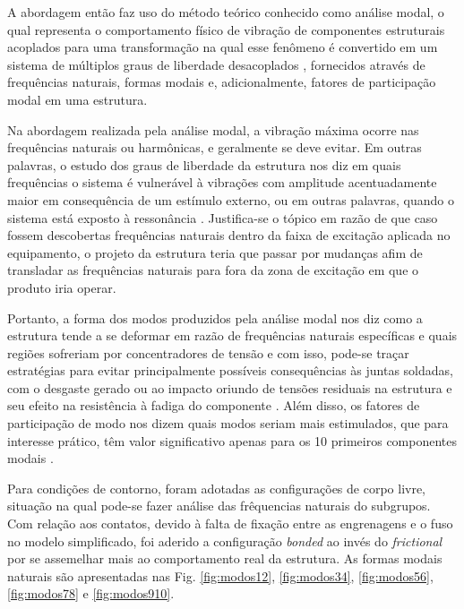 A abordagem então faz uso do método teórico conhecido como análise modal, o qual representa o comportamento físico de vibração de componentes estruturais acoplados para uma transformação na qual esse fenômeno é convertido em um sistema de múltiplos graus de liberdade desacoplados \cite{inmanbook}, fornecidos através de frequências naturais, formas modais e, adicionalmente, fatores de participação modal em uma estrutura.

Na abordagem realizada pela análise modal, a vibração máxima ocorre nas frequências naturais ou harmônicas, e geralmente se deve evitar. Em outras palavras, o estudo dos graus de liberdade da estrutura nos diz em quais frequências o sistema é vulnerável à vibrações com amplitude acentuadamente maior em consequência de um estímulo externo, ou em outras palavras, quando o sistema está exposto à ressonância \cite{inmanbook}. Justifica-se o tópico em razão de que caso fossem descobertas frequências naturais dentro da faixa de excitação aplicada no equipamento, o projeto da estrutura teria que passar por mudanças afim de transladar as frequências naturais para fora da zona de excitação em que o produto iria operar.

Portanto, a forma dos modos produzidos pela análise modal nos diz como a estrutura tende a se deformar em razão de frequências naturais específicas e quais regiões sofreriam por concentradores de tensão e com isso, pode-se traçar estratégias para evitar principalmente possíveis consequências às juntas soldadas, com o desgaste gerado \cite{failure} ou ao impacto oriundo de tensões residuais na estrutura e seu efeito na resistência à fadiga do componente \cite{fatigue}. Além disso, os fatores de participação de modo nos dizem quais modos seriam mais estimulados, que para interesse prático, têm valor significativo apenas para os 10 primeiros componentes modais \cite{inmanbook}.

Para condições de contorno, foram adotadas as configurações de corpo livre, situação na qual pode-se fazer análise das frêquencias naturais do subgrupos. Com relação aos contatos, devido à falta de fixação entre as engrenagens e o fuso no modelo simplificado, foi aderido a configuração \textit{bonded} ao invés do \textit{frictional} por se assemelhar mais ao comportamento real da estrutura.
As formas modais naturais são apresentadas nas Fig. \ref{fig:modos12}, \ref{fig:modos34}, \ref{fig:modos56}, \ref{fig:modos78} e \ref{fig:modos910}.

